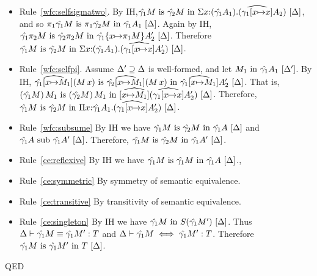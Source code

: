 \documentclass{article}
\theoremstyle{break}
\newcommand{\qed}{\mbox{QED}}
\newcommand{\env}{\gamma}
\newcommand{\envone}{\hat{\env_1}}
\newcommand{\envtwo}{\hat{\env_2}}
\newcommand{\envonex}{\widehat{\env_1[\cvar{\mapsto}\cvar]}}
\newenvironment{proof}{\noindent{\bf Proof:}\hspace*{0.5em}}{\hspace*{\fill}\qed}
\begin{document}
\begin{proof}
\begin{itemize}
\item Rule~\ref{wfc:selfsigmatwo}.
By IH,$\semanticequivterm{\world}{\envone\constructor}{\envtwo\constructor}
   {\ksigma{\cvar}{(\envone\kind_1)}{(\envonex{\kind_2})}}$, and so
$\semanticequivterm{\world}{\cpi{1}{\envone\constructor}}{\cpi{1}{\envtwo\constructor}}
   {\envone\kind_1}$.
Again by IH, 
$\semanticequivterm{\world}{\envone{\cpi{2}{\constructor}}}{\envtwo{\cpi{2}{\constructor}}}
   {\envone{\substitute{\cvar}{\cpi{1}{\constructor}}{\kind'_2}}}$.
Therefore
$\semanticequivterm{\world}{\envone\constructor}{\envtwo\constructor}
   {\ksigma{\cvar}{(\envone\kind_1)}{(\envonex{\kind'_2})}}$.

\item Rule~\ref{wfc:selfpi}.
Assume $\Delta'\supseteq\Delta$ is well-formed, and let
$\semanticvalidterm{\world'}{\constructor_1}{\envone\kind_1}$.
By IH,
$\semanticequivterm{\world}{\widehat{\envone[\cvar{\mapsto}\constructor_1]}(\capply{\constructor}{\cvar})}
   {\widehat{\envtwo[\cvar{\mapsto}\constructor_1]}(\capply{\constructor}{\cvar})}
   {\widehat{\envone[\cvar{\mapsto}\constructor_1]}\kind'_2}$.
That is,
$\semanticequivterm{\world}{\capply{(\envone\constructor)}\constructor_1}
   {\capply{(\envtwo\constructor)}\constructor_1}
   {\widehat{[\cvar{\mapsto}\constructor_1]}(\envonex\kind'_2)}$.
Therefore,
$\semanticequivterm{\world}{\envone\constructor}{\envtwo\constructor}
   {\kpi{\cvar}{\envone\kind_1}{(\envonex\kind'_2)}}$.

\item Rule~\ref{wfc:subsume}
By IH we have
$\semanticequivterm{\world}{\envone\constructor}{\envtwo\constructor}{\envone\kind}$
and
$\semanticsubtype{\world}{\envone\kind}{\envone\kind'}$.
Therefore,
$\semanticequivterm{\world}{\envone\constructor}{\envtwo\constructor}{\envone\kind'}$.

\item Rule~\ref{ce:reflexive}
By IH we have
$\semanticequivterm{\world}{\envone\constructor}{\envone\constructor}{\envone{\kind}}$.,

\item Rule~\ref{ce:symmetric}
By symmetry of semantic equivalence.

\item Rule~\ref{ce:transitive}
By transitivity of semantic equivalence.

\item Rule~\ref{ce:singleton}
By IH we have
$\semanticvalidterm{\world}{\envone\constructor}{\ksingleton{\envone\constructor'}}$.
Thus
$\equivconstructor{\world}{\envone\constructor}{\envone\constructor'}{\ktype}$ and
$\aconequiv{\world}{\envone\constructor}{\envone\constructor'}{\ktype}$.
Therefore
$\semanticequivterm{\world}{\envone\constructor}{\envone\constructor'}{\ktype}$.


\end{itemize}
\end{proof}
\end{document}
